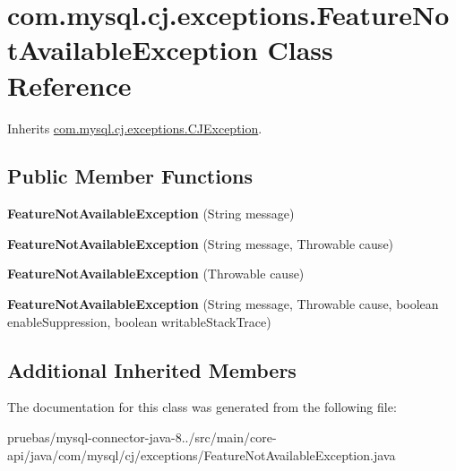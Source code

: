 \hypertarget{classcom_1_1mysql_1_1cj_1_1exceptions_1_1_feature_not_available_exception}{}\section{com.\+mysql.\+cj.\+exceptions.\+Feature\+Not\+Available\+Exception Class Reference}
\label{classcom_1_1mysql_1_1cj_1_1exceptions_1_1_feature_not_available_exception}


Inherits \mbox{\hyperlink{classcom_1_1mysql_1_1cj_1_1exceptions_1_1_c_j_exception}{com.\+mysql.\+cj.\+exceptions.\+C\+J\+Exception}}.

\subsection*{Public Member Functions}
\begin{DoxyCompactItemize}
\item 
\mbox{\label{classcom_1_1mysql_1_1cj_1_1exceptions_1_1_feature_not_available_exception_a31c6386da95ddc2dde257d3c9684e319}} 
{\bfseries Feature\+Not\+Available\+Exception} (String message)
\item 
\mbox{\label{classcom_1_1mysql_1_1cj_1_1exceptions_1_1_feature_not_available_exception_aa3320429365a0798dc27c4e0c70cbab1}} 
{\bfseries Feature\+Not\+Available\+Exception} (String message, Throwable cause)
\item 
\mbox{\label{classcom_1_1mysql_1_1cj_1_1exceptions_1_1_feature_not_available_exception_a6b27bbabb2ac94827ed0196cdb45da28}} 
{\bfseries Feature\+Not\+Available\+Exception} (Throwable cause)
\item 
\mbox{\label{classcom_1_1mysql_1_1cj_1_1exceptions_1_1_feature_not_available_exception_a6c69f78da4907a6a1faf8aad9d6a4d9e}} 
{\bfseries Feature\+Not\+Available\+Exception} (String message, Throwable cause, boolean enable\+Suppression, boolean writable\+Stack\+Trace)
\end{DoxyCompactItemize}
\subsection*{Additional Inherited Members}


The documentation for this class was generated from the following file\+:\begin{DoxyCompactItemize}
\item 
pruebas/mysql-\/connector-\/java-\/8../src/main/core-\/api/java/com/mysql/cj/exceptions/Feature\+Not\+Available\+Exception.\+java\end{DoxyCompactItemize}
